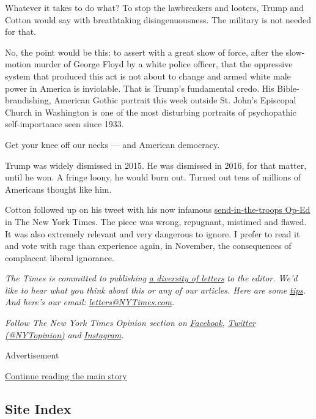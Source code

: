 Whatever it takes to do what? To stop the lawbreakers and looters, Trump
and Cotton would say with breathtaking disingenuousness. The military is
not needed for that.

No, the point would be this: to assert with a great show of force, after
the slow-motion murder of George Floyd by a white police officer, that
the oppressive system that produced this act is not about to change and
armed white male power in America is inviolable. That is Trump's
fundamental credo. His Bible-brandishing, American Gothic portrait this
week outside St. John's Episcopal Church in Washington is one of the
most disturbing portraits of psychopathic self-importance seen since
1933.

Get your knee off our necks --- and American democracy.

Trump was widely dismissed in 2015. He was dismissed in 2016, for that
matter, until he won. A fringe loony, he would burn out. Turned out tens
of millions of Americans thought like him.

Cotton followed up on his tweet with his now infamous
\href{https://www.nytimes3xbfgragh.onion/2020/06/03/opinion/tom-cotton-protests-military.html}{send-in-the-troops
Op-Ed} in The New York Times. The piece was wrong, repugnant, mistimed
and flawed. It was also extremely relevant and very dangerous to ignore.
I prefer to read it and vote with rage than experience again, in
November, the consequences of complacent liberal ignorance.

\emph{The Times is committed to publishing}
\href{https://www.nytimes3xbfgragh.onion/2019/01/31/opinion/letters/letters-to-editor-new-york-times-women.html}{\emph{a
diversity of letters}} \emph{to the editor. We'd like to hear what you
think about this or any of our articles. Here are some}
\href{https://help.nytimes3xbfgragh.onion/hc/en-us/articles/115014925288-How-to-submit-a-letter-to-the-editor}{\emph{tips}}\emph{.
And here's our email:}
\href{mailto:letters@NYTimes.com}{\emph{letters@NYTimes.com}}\emph{.}

\emph{Follow The New York Times Opinion section on}
\href{https://www.facebookcorewwwi.onion/nytopinion}{\emph{Facebook}}\emph{,}
\href{http://twitter.com/NYTOpinion}{\emph{Twitter (@NYTopinion)}}
\emph{and}
\href{https://www.instagram.com/nytopinion/}{\emph{Instagram}}\emph{.}

Advertisement

\protect\hyperlink{after-bottom}{Continue reading the main story}

\hypertarget{site-index}{%
\subsection{Site Index}\label{site-index}}

